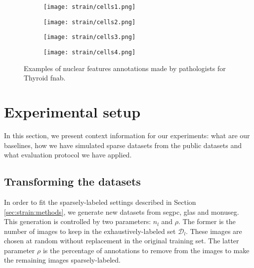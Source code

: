 \begin{figure}
    \centering
    \begin{subfigure}{.235\textwidth}
      \centering
      \texttt{[image: strain/cells1.png]}
      \caption{}
      \label{sfig:strain:cell1}
    \end{subfigure}
    \begin{subfigure}{.235\textwidth}
      \centering
      \texttt{[image: strain/cells2.png]}
      \caption{}
      \label{sfig:strain:cell2}
    \end{subfigure}
    \begin{subfigure}{.235\textwidth}
      \centering
      \texttt{[image: strain/cells3.png]}
      \caption{}
      \label{sfig:strain:cell3}
    \end{subfigure}
    \begin{subfigure}{.235\textwidth}
      \centering
      \texttt{[image: strain/cells4.png]}
      \caption{}
      \label{sfig:strain:cell4}
    \end{subfigure}
    \caption{Examples of nuclear features annotations made by pathologists for Thyroid \acrshort{fnab}.}
    \label{fig:strain:cells_examples}
\end{figure}


\section{Experimental setup}
\label{sec:strain:experiments}

In this section, we present context information for our experiments: what are our baselines, how we have simulated sparse datasets from the public datasets and what evaluation protocol we have applied.

\subsection{Transforming the datasets}

In order to fit the sparsely-labeled settings described in Section \ref{sec:strain:methods}, we generate new datasets from \acrshort{segpc}, \acrshort{glas} and \acrshort{monuseg}. This generation is controlled by two parameters: $n_l$ and $\rho$. The former is the number of images to keep in the exhaustively-labeled set $\mathcal{D}_l$. These images are chosen at random without replacement in the original training set. The latter parameter $\rho$ is the percentage of annotations to remove from the images to make the remaining images sparsely-labeled.

